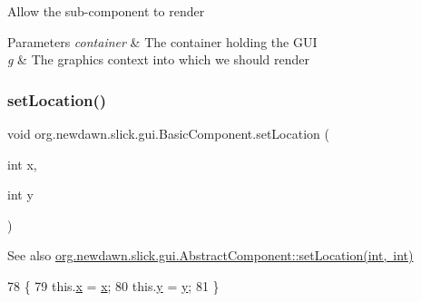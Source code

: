 Allow the sub-\/component to render


\begin{DoxyParams}{Parameters}
{\em container} & The container holding the G\+UI \\
\hline
{\em g} & The graphics context into which we should render \\
\hline
\end{DoxyParams}
\mbox{\label{classorg_1_1newdawn_1_1slick_1_1gui_1_1_basic_component_aa98b14f3086fd9f9b9621c17c8481fcf}} 
\subsubsection{\texorpdfstring{set\+Location()}{setLocation()}}
{\footnotesize\ttfamily void org.\+newdawn.\+slick.\+gui.\+Basic\+Component.\+set\+Location (\begin{DoxyParamCaption}\item[{int}]{x,  }\item[{int}]{y }\end{DoxyParamCaption})\hspace{0.3cm}{\ttfamily [inline]}}

\begin{DoxySeeAlso}{See also}
\mbox{\hyperlink{classorg_1_1newdawn_1_1slick_1_1gui_1_1_abstract_component_a2cc82d8f8d0fddc059af2e60853f085a}{org.\+newdawn.\+slick.\+gui.\+Abstract\+Component\+::set\+Location(int, int)}} 
\end{DoxySeeAlso}

\begin{DoxyCode}
78                                           \{
79         this.\mbox{\hyperlink{classorg_1_1newdawn_1_1slick_1_1gui_1_1_basic_component_ad0321d01a89b24e687e4e156fab90c67}{x}} = \mbox{\hyperlink{classorg_1_1newdawn_1_1slick_1_1gui_1_1_basic_component_ad0321d01a89b24e687e4e156fab90c67}{x}};
80         this.\mbox{\hyperlink{classorg_1_1newdawn_1_1slick_1_1gui_1_1_basic_component_abca0dbce710368534eabb3f4168f47d5}{y}} = \mbox{\hyperlink{classorg_1_1newdawn_1_1slick_1_1gui_1_1_basic_component_abca0dbce710368534eabb3f4168f47d5}{y}};
81     \}
\end{DoxyCode}


